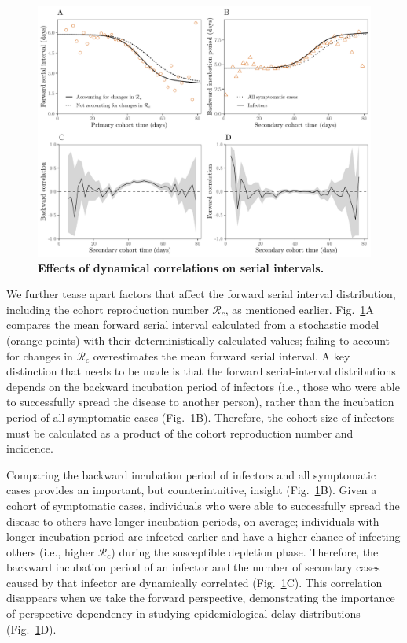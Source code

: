 \documentclass[12pt]{article}
\newcommand{\fref}[1]{Fig.~\ref{fig:#1}}
\begin{document}
\begin{figure}[!th]
\includegraphics[width=\textwidth]{forward_tease.pdf}
\caption{
\textbf{Effects of dynamical correlations on serial intervals.}
}
\label{fig:tease}
\end{figure}

We further tease apart factors that affect the forward serial interval distribution, including the cohort reproduction number $\mathcal R_c$, as mentioned earlier.
\fref{tease}A compares the mean forward serial interval calculated from a stochastic model (orange points) with their deterministically calculated values;
failing to account for changes in $\mathcal R_c$ overestimates the mean forward serial interval.
A key distinction that needs to be made is that the forward serial-interval distributions depends on the backward incubation period of infectors (i.e., those who were able to successfully spread the disease to another person), rather than the incubation period of all symptomatic cases (\fref{tease}B).
Therefore, the cohort size of infectors must be calculated as a product of the cohort reproduction number and incidence.

Comparing the backward incubation period of infectors and all symptomatic cases provides an important, but counterintuitive, insight (\fref{tease}B).
Given a cohort of symptomatic cases, individuals who were able to successfully spread the disease to others have longer incubation periods, on average;
individuals with longer incubation period are infected earlier and have a higher chance of infecting others (i.e., higher $\mathcal R_c$) during the susceptible depletion phase.
Therefore, the backward incubation period of an infector and the number of secondary cases caused by that infector are dynamically correlated (\fref{tease}C).
This correlation disappears when we take the forward perspective, demonstrating the importance of perspective-dependency in studying epidemiological delay distributions (\fref{tease}D).
\end{document}
